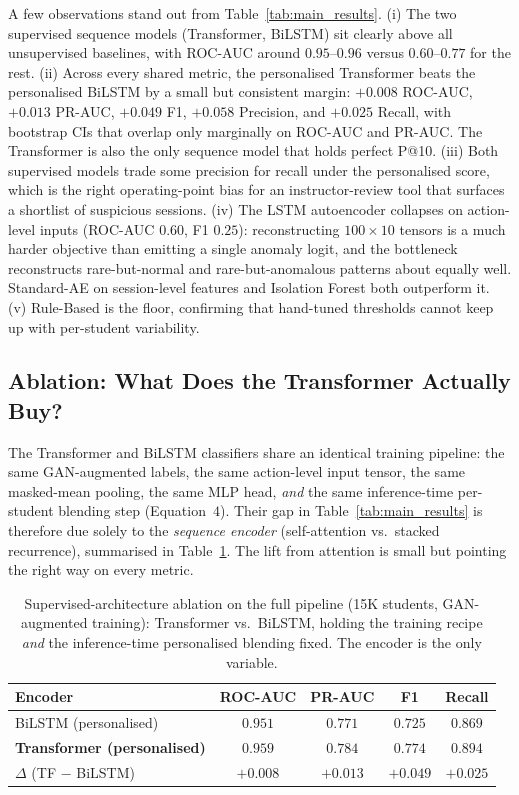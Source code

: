 \documentclass[sigconf]{acmart}
\begin{document}
A few observations stand out from Table~\ref{tab:main_results}. (i) The two supervised sequence models (Transformer, BiLSTM) sit clearly above all unsupervised baselines, with ROC-AUC around $0.95$--$0.96$ versus $0.60$--$0.77$ for the rest. (ii) Across every shared metric, the personalised Transformer beats the personalised BiLSTM by a small but consistent margin: $+0.008$ ROC-AUC, $+0.013$ PR-AUC, $+0.049$ F1, $+0.058$ Precision, and $+0.025$ Recall, with bootstrap CIs that overlap only marginally on ROC-AUC and PR-AUC. The Transformer is also the only sequence model that holds perfect P@10. (iii) Both supervised models trade some precision for recall under the personalised score, which is the right operating-point bias for an instructor-review tool that surfaces a shortlist of suspicious sessions. (iv) The LSTM autoencoder collapses on action-level inputs (ROC-AUC $0.60$, F1 $0.25$): reconstructing $100\!\times\!10$ tensors is a much harder objective than emitting a single anomaly logit, and the bottleneck reconstructs rare-but-normal and rare-but-anomalous patterns about equally well. Standard-AE on session-level features and Isolation Forest both outperform it. (v) Rule-Based is the floor, confirming that hand-tuned thresholds cannot keep up with per-student variability.

\subsection{Ablation: What Does the Transformer Actually Buy?}
\label{sec:ablation}
The Transformer and BiLSTM classifiers share an identical training pipeline: the same GAN-augmented labels, the same action-level input tensor, the same masked-mean pooling, the same MLP head, \emph{and} the same inference-time per-student blending step (Equation~$4$). Their gap in Table~\ref{tab:main_results} is therefore due solely to the \emph{sequence encoder} (self-attention vs.\ stacked recurrence), summarised in Table~\ref{tab:ablation_arch}. The lift from attention is small but pointing the right way on every metric.

\begin{table}[htbp]
\caption{Supervised-architecture ablation on the full pipeline (15K students, GAN-augmented training): Transformer vs.\ BiLSTM, holding the training recipe \emph{and} the inference-time personalised blending fixed. The encoder is the only variable.}
\label{tab:ablation_arch}
\centering
\small
\begin{tabular}{lcccc}
\toprule
\textbf{Encoder} & \textbf{ROC-AUC} & \textbf{PR-AUC} & \textbf{F1} & \textbf{Recall} \\
\midrule
BiLSTM (personalised)               & $0.951$ & $0.771$ & $0.725$ & $0.869$ \\
\textbf{Transformer (personalised)} & $\mathbf{0.959}$ & $\mathbf{0.784}$ & $\mathbf{0.774}$ & $\mathbf{0.894}$ \\
\midrule
$\Delta$ (TF $-$ BiLSTM)            & $+0.008$ & $+0.013$ & $+0.049$ & $+0.025$ \\
\bottomrule
\end{tabular}
\end{table}
\end{document}
